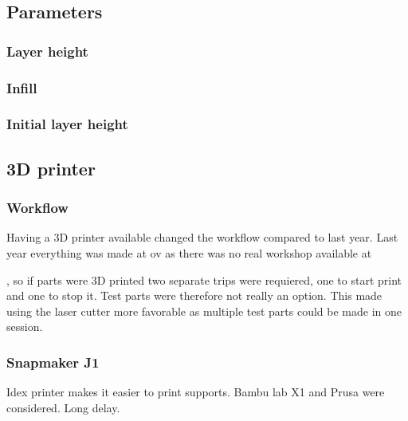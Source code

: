 \subsection{Parameters}
\subsubsection{Layer height}
\subsubsection{Infill}
\subsubsection{Initial layer height}




\subsection{3D printer}

\subsubsection{Workflow}
Having a 3D printer available changed the workflow compared to last year.
Last year everything was made at \gls{ov} as there was no real workshop available at

, so if parts were 3D printed two separate trips were requiered, one to start print and one to stop it.
Test parts were therefore not really an option.
This made using the laser cutter more favorable as multiple test parts could be made in one session.

\subsubsection{Snapmaker J1}
Idex printer makes it easier to print supports.
Bambu lab X1 and Prusa were considered.
Long delay.

